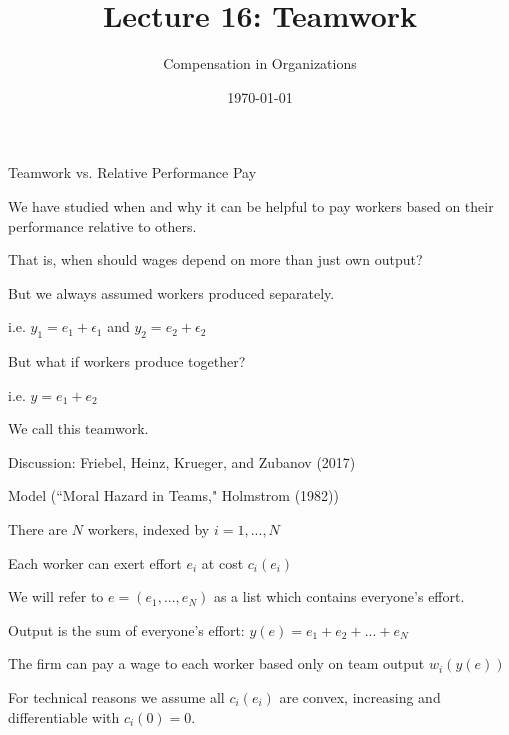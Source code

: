 \documentclass[aspectratio=169,usenames,dvipsnames]{beamer}
\title[diss]{Lecture 16: Teamwork} %
\author{Compensation in Organizations} %
\institute[shortinst]{Jacob Kohlhepp}
\date{\today} %
\newenvironment{wideitemize}{\itemize\addtolength{\itemsep}{10pt}}{\enditemize}
\begin{document}
\begin{frame}
\titlepage %

\end{frame}

\begin{frame}{Teamwork vs. Relative Performance Pay}

\begin{wideitemize}
    \item We have studied when and why it can be helpful to pay workers based on their performance relative to others.
    \item That is, when should wages depend on more than just own output?
    \item But we always assumed workers produced separately.
    \begin{wideitemize}
            \item i.e. $y_1=e_1+\epsilon_1$ and $y_2=e_2+\epsilon_2$

    \end{wideitemize}
    \item But what if workers produce together?
    \begin{wideitemize}
            \item i.e. $y=e_1+e_2$
    \end{wideitemize}
    \item We call this teamwork.
\end{wideitemize}
    
\end{frame}

\begin{frame}
\centering
    \huge Discussion: Friebel, Heinz, Krueger, and Zubanov (2017)

\end{frame}

\begin{frame}{Model (``Moral Hazard in Teams," Holmstrom (1982))}

\begin{wideitemize}
    \item There are $N$ workers, indexed by $i=1,...,N$
    \item Each worker can exert effort $e_i$ at cost $c_i(e_i)$
    \item We will refer to $e=(e_1,...,e_N)$ as a list which contains everyone's effort.
    \item Output is the sum of everyone's effort: $y(e)=e_1+e_2+...+e_N$
    \item The firm can pay a wage to each worker based only on team output $w_i(y(e))$
    \item For technical reasons we assume all $c_i(e_i)$ are convex, increasing  and differentiable with $c_i(0)=0$.
\end{wideitemize}
\end{frame}
\end{document}
